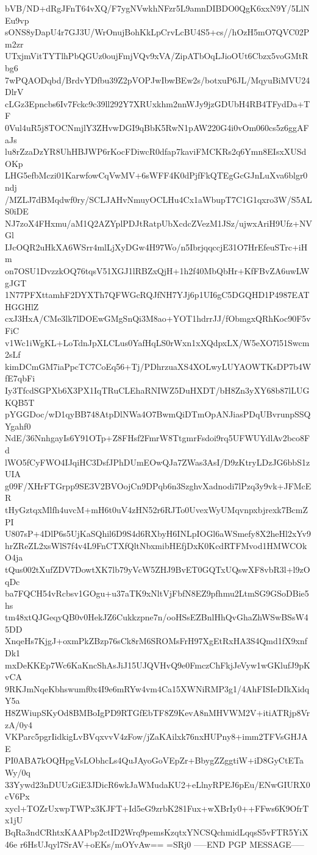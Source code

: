 bVB/ND+dRgJFnT64vXQ/F7ygNVwkhNFzr5L9amnDIBDO0QgK6xxN9Y/5LlNEu9vp
sONS8yDapU4r7GJ3U/WrOnujBohKkLpCrvLcBU4S5+cs//hOzH5mO7QVC02Pm2zr
UTxjmVitTYTlhPbQGUz0oujFmjVQv9xVA/ZipATbOqLJioOUt6Cbzx5voGMtRbg6
7wPQAODqbd/BrdvYDfbu39Z2pVOPJwIbwBEw2s/botxuP6JL/MqyuBiMVU24DlrV
cLGz3Epncbs6Iv7Fckc9c39ll292Y7XRUxkhm2nnWJy9jzGDUbH4RB4TFydDa+TF
0Vul4uR5j8TOCNmjlY3ZHvwDGI9qBbK5RwN1pAW220G4i0vOm060cs5z6ggAFaJs
lu8rZzaDzYR8UhHBJWP6rKocFDiwcR0dfap7kaviFMCKRs2q6Ymn8EIsxXUSdOKp
LHG5efbMczi01KarwfowCqVwMV+6sWFF4K0dPjfFkQTEgGcGJnLuXva6blgr0ndj
/MZLJ7dBMqdwf0ry/SCLJAHvNmuyOCLHu4Cx1aWbupT7C1G1qxro3W/S5ALS0iDE
NJ7zoX4FHxmu/aM1Q2AZYplPDJtRatpUbXcdcZVezM1JSz/ujwxAriH9Ufz+NVGl
IJcOQR2uHkXA6WSrr4mlLjXyDGw4H97Wo/n5IbrjqqccjE31O7HrEfeuSTrc+iHm
on7OSU1DvzzkOQ76tqsV51XGJ1lRBZxQjH+1h2f40MbQbHr+KfFBvZA6uwLWgJGT
1N77PFXttamhF2DYXTh7QFWGcRQJfNH7YJj6p1UI6gC5DGQHD1P4987EATHGGHlZ
cxJ3HxA/CMe3lk7lDOEwGMgSnQi3M8ao+YOT1hdrrJJ/fObmgxQRhKoc90F5vFiC
v1Wc1iWgKL+LoTdnJpXLCLus0YafHqLS0rWxn1xXQdpxLX/W5eXO7l51Swcm2sLf
kimDCmGM7iaPpcTC7CoEq56+Tj/PDhrzuaXS4XOLwyLUYAOWTKsDP7b4WfE7qbFi
Iy3TfcdSGPXb6X3PX1IqTRuCLEhaRNIWZ5DuHXDT/bH8Zn3yXY68b87lLUGKQB5T
pYGGDoc/wD1qyBB748AtpDlNWa4O7BwmQiDTmOpANJiasPDqUBvrunpSSQYgahf0
NdE/36NnhgayIs6Y91OTp+Z8FHsf2FmrW8TtgmrFsdoi9rq5UFWUYdlAv2bco8Fd
lWO5fCyFWO4IJqiHC3DsfJPhDUmEOwQJa7ZWas3AsI/D9zKtryLDzJG6bbS1zUIA
g09F/XHrFTGrpp9SE3V2BVOojCn9DPqb6n3SzghvXadnodi7lPzq3y9vk+JFMcER
tHyGztqxMlfh4uvcM+mH6t0uV4zHN52r6RJTo0UvexWyUMqvnpxbjrexk7BcmZPI
U807sP+4DlP6s5UjKaSQhil6D9S4d6RXbyH6INLpIOGl6aWSmefy8X2heHl2xYv9
hrZReZL2xsWlS7f4v4L9FnCTXfQltNbxmibHEfjDxK0KcdRTFMvod1HMWCOkO4ja
tQus002tXufZDV7DowtXK7lb79yVcW5ZHJ9BvET0GQTxUQswXF8vbR3l+l9zOqDc
ba7FQCH54vRcbsv1GOgu+u37aTK9xNltVjFbfN8EZ9pfhmu2LtmSG9GSoDBie5hs
tm48xtQJGeqyQB0v0HekJZ6Cukkzpne7n/ooHSsEZBnlHhQvGhaZhWSwBSsW45DD
XnqeHs7KjgJ+oxmPkZBzp76sCk8rM6SROMsFrH97XgEtRxHA3S4Qmd1fX9xnfDk1
mxDeKKEp7Wc6KaKncShAsJiJ15UJQVHvQ9e0FmczChFkjJeVyw1wGKlufJ9pKvCA
9RKJmNqeKbhswumf0x4I9e6mRYw4vm4Ca15XWNiRMP3g1/4AhFISIeDIkXidqY5a
H8ZWiupSKyOd8BMBoIgPD9RTGfEbTF8Z9KevA8nMHVWM2V+itiATRjp8VrzA/0y4
VKParc5pgrIidkigLvBVqxvvV4zFow/jZaKAilxk76nxHUPny8+imm2TFVsGHJAE
PI0ABA7kOQHpgVsLObhcLs4QuJAyoGoVEpZr+BbygZZggtiW+iD8GyCtETaWy/0q
33Yywd23nDUUzGiE3JDicR6wkJaWMudaKU2+eLlnyRPEJ6pEu/ENwGIURX0cV6Px
xycl+TOZrUxwpTWPx3KJFT+Id5eG9zrbK281Fux+wXBrIy0++FFws6K9OfrTx1jU
BqRa3ndCRhtxKAAPbp2ctID2Wrq9pemsKzqtxYNCSQchmidLqqsS5vFTR5YiX46e
r6HsUJqyl7SrAV+oEKs/mOYvAw==
=SRj0
-----END PGP MESSAGE-----
